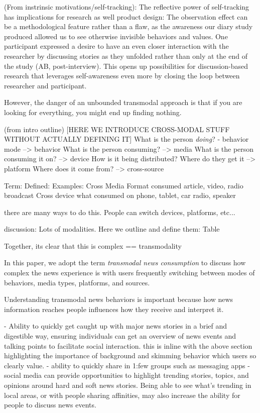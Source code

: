 \documentclass[sigchi]{acmart}
\begin{document}
(From instrinsic motivations/self-tracking):
The reflective power of self-tracking has implications for research as well product design: The observation effect can be a methodological feature rather than a flaw, as the awareness our diary study produced allowed us to see otherwise invisible behaviors and values. One participant expressed a desire to have an even closer interaction with the researcher by discussing stories as they unfolded rather than only at the end of the study (AB, post-interview). This opens up possibilities for discussion-based research that leverages self-awareness even more by closing the loop between researcher and participant.

However, the danger of an unbounded  transmodal approach is that if you are looking for everything, you might end up finding nothing.

(from intro outline)
[HERE WE INTRODUCE CROSS-MODAL STUFF WITHOUT ACTUALLY DEFINING IT]
What is the person \textit{doing}? - behavior mode --> behavior
What is the person consuming? --> media
What is the person consuming it on? --> device
How is it being distributed? Where do they get it --> platform
Where does it come from? --> cross-source

Term:        Defined:        Examples:
Cross Media   Format consumed   article, video, radio broadcast
Cross device    what consumed on    phone, tablet, car radio, speaker

there are many ways to do this. People can switch devices, platforms, etc...

discussion:
Lots of modalities. Here we outline and define them:
Table

Together, its clear that this is complex == transmodality

In this paper, we adopt the term \emph{transmodal news consumption} to discuss how complex the news experience is with users frequently switching between modes of behaviors, media types, platforms, and sources.

Understanding transmodal news behaviors is important because how news information reaches people influences how they receive and interpret it.

- Ability to quickly get caught up with major news stories in a brief and digestible way, ensuring individuals can get an overview of news events and talking points to facilitate social interaction. this is inline with the above section highlighting the importance of background and skimming behavior which users so clearly value. 
- ability to quickly share in 1:few groups such as messaging apps
- social media can provide opportunities to highlight trending stories, topics, and opinions around hard and soft news stories. Being able to see what's trending in local areas, or with people sharing affinities, may also increase the ability for people to discuss news events. 
\end{document}
